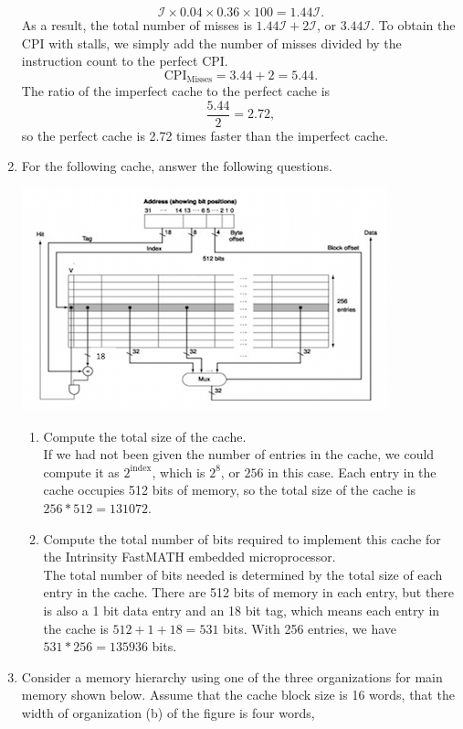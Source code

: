 \documentclass{article}
\begin{document}
\begin{enumerate}
\[
\mathcal{I}\times 0.04\times 0.36\times 100 = 1.44\mathcal{I}.
\]
As a result, the total number of misses is $1.44\mathcal{I} + 2\mathcal{I}$, or $3.44\mathcal{I}$.
To obtain the CPI with stalls, we simply add the number of misses divided by the instruction count to the perfect CPI.
\[
\text{CPI}_{\text{Misses}} = 3.44 + 2 = 5.44.
\]
The ratio of the imperfect cache to the perfect cache is
\[
\frac{5.44}{2} = 2.72,
\]
so the perfect cache is 2.72 times faster than the imperfect cache.
\item For the following cache, answer the following questions.
\begin{center}
\includegraphics[scale=0.7]{hw5_graphic}
\end{center}
\begin{enumerate}
\item Compute the total size of the cache.\\
If we had not been given the number of entries in the cache, we could compute it as $2^{\text{index}}$, which is $2^{8}$, or $256$ in this case.
Each entry in the cache occupies 512 bits of memory, so the total size of the cache is $256 * 512 = 131072$.
\item Compute the total number of bits required to implement this cache for the Intrinsity FastMATH embedded microprocessor.\\
The total number of bits needed is determined by the total size of each entry in the cache.
There are 512 bits of memory in each entry, but there is also a 1 bit data entry and an 18 bit tag, which means each entry in the cache is $512 + 1 + 18 = 531$ bits.
With 256 entries, we have $531 * 256 = 135936$ bits.
\end{enumerate}
\item Consider a memory hierarchy using one of the three organizations for main memory shown below.
Assume that the cache block size is 16 words, that the width of organization (b) of the figure is four words,

\end{enumerate}
\end{document}
